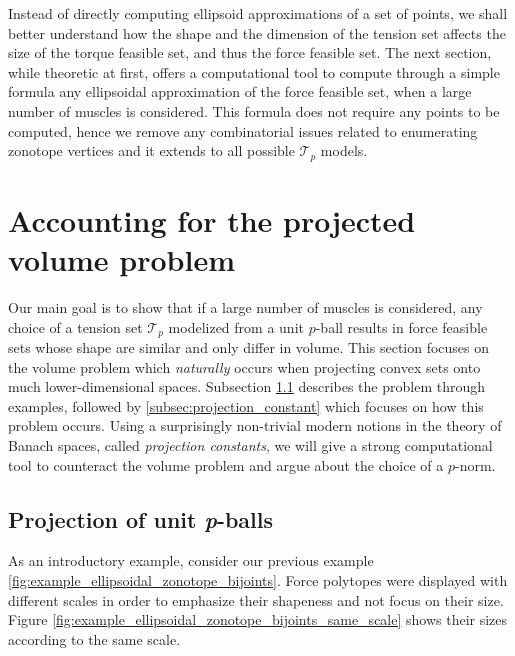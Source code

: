 
Instead of directly computing ellipsoid approximations of a set of points, we shall better understand how the shape and the dimension of the tension set affects the size of the torque feasible set, and thus the force feasible set. The next section, while theoretic at first, offers a computational tool to compute through a simple formula any ellipsoidal approximation of the force feasible set, when a large number of muscles is considered. This formula does not require any points to be computed, hence we remove any combinatorial issues related to enumerating zonotope vertices and it extends to all possible $\mathcal{T}_p$ models.

\section{Accounting for the projected volume problem}
\label{sec:projected_volume_problem}
Our main goal is to show that if a large number of muscles is considered, any choice of a tension set $\mathcal{T}_p$ modelized from a unit $p$-ball results in force feasible sets whose shape are similar and only differ in volume. This section focuses on the volume problem which \emph{naturally} occurs when projecting convex sets onto much lower-dimensional spaces. Subsection \ref{subsec:proj_unit_p_ball} describes the problem through examples, followed by \ref{subsec:projection_constant} which focuses on how this problem occurs. Using a surprisingly non-trivial modern notions in the theory of Banach spaces, called \emph{projection constants}, we will give a strong computational tool to counteract the volume problem and argue about the choice of a $p$-norm.

\subsection{Projection of unit \emph{p}-balls}
\label{subsec:proj_unit_p_ball}
As an introductory example, consider our previous example \ref{fig:example_ellipsoidal_zonotope_bijoints}. Force polytopes were displayed with different scales in order to emphasize their shapeness and not focus on their size. Figure \ref{fig:example_ellipsoidal_zonotope_bijoints_same_scale} shows their sizes according to the same scale.

